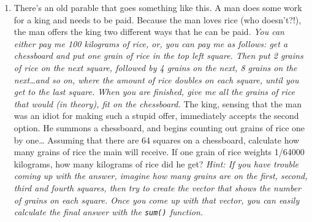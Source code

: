 \documentclass[]{book}
\providecommand{\tightlist}{%
  \setlength{\itemsep}{0pt}\setlength{\parskip}{0pt}}
\theoremstyle{definition}
\theoremstyle{definition}
\theoremstyle{remark}
\begin{document}
\begin{enumerate}
\def\labelenumi{\arabic{enumi}.}
\setcounter{enumi}{3}
\tightlist
\item
  There's an old parable that goes something like this. A man does some
  work for a king and needs to be paid. Because the man loves rice (who
  doesn't?!), the man offers the king two different ways that he can be
  paid. \emph{You can either pay me 100 kilograms of rice, or, you can
  pay me as follows: get a chessboard and put one grain of rice in the
  top left square. Then put 2 grains of rice on the next square,
  followed by 4 grains on the next, 8 grains on the next\ldots{}and so
  on, where the amount of rice doubles on each square, until you get to
  the last square. When you are finished, give me all the grains of rice
  that would (in theory), fit on the chessboard.} The king, sensing that
  the man was an idiot for making such a stupid offer, immediately
  accepts the second option. He summons a chessboard, and begins
  counting out grains of rice one by one\ldots{} Assuming that there are
  64 squares on a chessboard, calculate how many grains of rice the main
  will receive. If one grain of rice weights 1/64000 kilograms, how many
  kilograms of rice did he get? \emph{Hint: If you have trouble coming
  up with the answer, imagine how many grains are on the first, second,
  third and fourth squares, then try to create the vector that shows the
  number of grains on each square. Once you come up with that vector,
  you can easily calculate the final answer with the \texttt{sum()}
  function.}
\end{enumerate}
\end{document}
